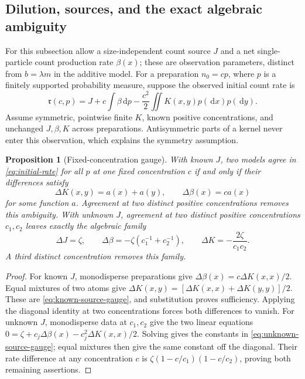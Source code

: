 \documentclass[11pt]{article}
\numberwithin{equation}{section}
\newtheorem{proposition}[theorem]{Proposition}
\theoremstyle{definition}
\theoremstyle{remark}
\newcommand{\dd}{\,\mathrm d}
\newcommand{\1}{\mathbf 1}
\begin{document}
\subsection{Dilution, sources, and the exact algebraic ambiguity}

For this subsection allow a size-independent count source $J$ and a net
single-particle count production rate $\beta(x)$; these are observation
parameters, distinct from $b=\lambda m$ in the additive model.
For a preparation $n_0=cp$, where $p$ is a finitely supported probability
measure, suppose the observed initial count rate is
\begin{equation}
 \mathfrak r(c,p)=J+c\int\beta\dd p
                 -\frac{c^2}{2}\iint K(x,y)p(\dd x)p(\dd y).
 \label{eq:initial-rate}
\end{equation}
Assume symmetric, pointwise finite $K$, known positive concentrations,
and unchanged $J,\beta,K$ across preparations. Antisymmetric parts of a
kernel never enter this observation, which explains the symmetry assumption.

\begin{proposition}[Fixed-concentration gauge]\label{prop:dilution-gauge}
With known $J$, two models agree in \eqref{eq:initial-rate} for all $p$
at one fixed concentration $c$ if and only if their differences satisfy
\begin{equation}
 \Delta K(x,y)=a(x)+a(y),\qquad\Delta\beta(x)=ca(x)
 \label{eq:known-source-gauge}
\end{equation}
for some function $a$. Agreement at two distinct positive concentrations
removes this ambiguity. With unknown $J$, agreement at two distinct
positive concentrations $c_1,c_2$ leaves exactly the algebraic family
\begin{equation}
 \Delta J=\zeta,\qquad
 \Delta\beta=-\zeta(c_1^{-1}+c_2^{-1}),\qquad
 \Delta K=-\frac{2\zeta}{c_1c_2}.
 \label{eq:unknown-source-gauge}
\end{equation}
A third distinct concentration removes this family.
\end{proposition}

\begin{proof}
For known $J$, monodisperse preparations give
$\Delta\beta(x)=c\Delta K(x,x)/2$. Equal mixtures of two atoms give
$\Delta K(x,y)=[\Delta K(x,x)+\Delta K(y,y)]/2$.
These are \eqref{eq:known-source-gauge}, and substitution proves
sufficiency. Applying the diagonal identity at two concentrations
forces both differences to vanish.
For unknown $J$, monodisperse data at $c_1,c_2$ give the two linear
equations
$0=\zeta+c_j\Delta\beta(x)-c_j^2\Delta K(x,x)/2$.
Solving gives the constants in \eqref{eq:unknown-source-gauge}; equal
mixtures then give the same constant off the diagonal. Their rate
difference at any concentration $c$ is
$\zeta(1-c/c_1)(1-c/c_2)$, proving both remaining assertions.
\end{proof}
\end{document}
